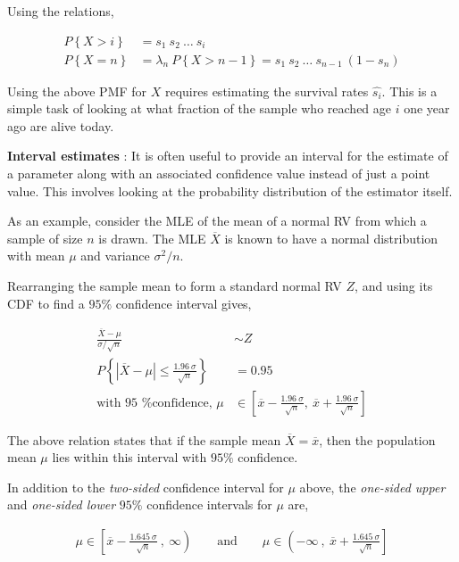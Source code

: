 Using the relations,

\begin{align}
	P \left\{X > i\right\} &= s_1\ s_2\ \dots\ s_i \nonumber \\
	P\left\{X = n\right\} &= \lambda_n\ P \left\{X > n-1\right\} = s_1\ s_2\ \dots\ s_{n-1}\ (1 - s_n) 
\end{align}

Using the above PMF for $ X $ requires estimating the survival rates $ \widehat{s_i} $. This is a simple task of looking at what fraction of the sample who reached age $ i $ one year ago are alive today.

\textbf{Interval estimates} : It is often useful to provide an interval for the estimate of a parameter along with an associated confidence value instead of just a point value. This involves looking at the probability distribution of the estimator itself.

As an example, consider the MLE of the mean of a normal RV from which a sample of size $ n $ is drawn. The MLE $ \overline{X} $ is known to have a normal distribution with mean $ \mu $ and variance $ \sigma^2 / n $.

Rearranging the sample mean to form a standard normal RV $ Z $, and using its CDF to find a $ 95\% $ confidence interval gives,

\begin{align}
	\frac{\overline{X} - \mu}{\sigma / \sqrt{n}} &\sim Z \nonumber \\
	P \left\{ | \overline{X} - \mu | \leq \frac{1.96\ \sigma}{\sqrt{n}} \right\} &= 0.95 \nonumber \\
	\text{with 95 \% confidence, } \mu &\in \left[ \overline{x} - \frac{1.96\ \sigma}{\sqrt{n}}, \ \overline{x} + \frac{1.96\ \sigma}{\sqrt{n}} \right]
\end{align}

The above relation states that if the sample mean $ \overline{X} = \overline{x} $, then the population mean $ \mu $ lies within this interval with $ 95\% $ confidence.

In addition to the \textit{two-sided} confidence interval for $ \mu $ above, the \textit{one-sided upper} and \textit{one-sided lower} $ 95\% $ confidence intervals for $ \mu $ are,

\begin{align}
	\mu \in \left[ \overline{x} - \frac{1.645\ \sigma}{\sqrt{n}}\ ,\  \infty \right) \qquad \text{and} \qquad \mu \in \left( -\infty\ ,\  \overline{x} + \frac{1.645\ \sigma}{\sqrt{n}} \right]
\end{align}

